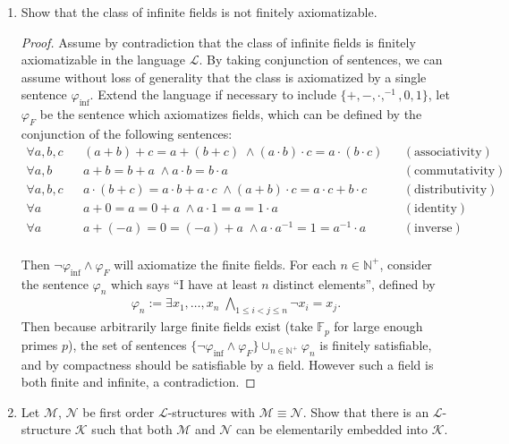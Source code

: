 \documentclass{article}
\begin{document}
\begin{enumerate}
  \item Show that the class of infinite fields is not finitely
    axiomatizable.
    \begin{proof}
      Assume by contradiction that the class of infinite fields is finitely
      axiomatizable in the language $\mathcal{L}$. By taking conjunction of
      sentences, we can assume without loss of generality that the class is
      axiomatized by a single sentence $\varphi_{\text{inf}}$. Extend the
      language if necessary to include $\{+,-,\cdot,^{-1},0,1\}$, let
      $\varphi_F$ be the sentence which axiomatizes fields, which can be
      defined by the conjunction of the following sentences:
      \begin{align*}
        \forall a,b,c && (a+b)+c=a+(b+c)\; \wedge (a\cdot b)\cdot
          c=a\cdot(b\cdot c)  && (\text{associativity}) \\
        \forall a,b   && a+b=b+a\; \wedge a\cdot b=b\cdot a  &&
          (\text{commutativity}) \\
        \forall a,b,c && a\cdot(b+c)=a\cdot b+a\cdot c\; \wedge (a+b)\cdot
          c=a\cdot c+b\cdot c  && (\text{distributivity}) \\
        \forall a     && a+0=a=0+a\; \wedge a\cdot1=a=1\cdot a  &&
          (\text{identity}) \\
        \forall a     && a+(-a)=0=(-a)+a\; \wedge a\cdot
          a^{-1}=1=a^{-1}\cdot a  && (\text{inverse}) \\
      \end{align*}

      Then $\neg\varphi_{\text{inf}}\wedge\varphi_F$ will axiomatize the
      finite fields. For each $n\in\mathbb{N}^+$, consider the sentence
      $\varphi_n$ which says ``I have at least $n$ distinct elements'',
      defined by
      \begin{align*}
        \varphi_n := \exists x_1,\ldots,x_n\; \bigwedge_{1\leq i<j\leq n}
        \neg x_i=x_j.
      \end{align*}
      Then because arbitrarily large finite fields exist (take
      $\mathbb{F}_p$ for large enough primes $p$), the set of sentences
      $\{\neg\varphi_{\text{inf}}\wedge\varphi_F\}\cup_{n\in\mathbb{N}^+}\varphi_n$
      is finitely satisfiable, and by compactness should be satisfiable by
      a field. However such a field is both finite and infinite, a
      contradiction.
    \end{proof}

  \item Let $\mathcal{M}$, $\mathcal{N}$ be first order
    $\mathcal{L}$-structures with $\mathcal{M}\equiv\mathcal{N}$. Show that
    there is an $\mathcal{L}$-structure $\mathcal{K}$ such that both
    $\mathcal{M}$ and $\mathcal{N}$ can be elementarily embedded into
    $\mathcal{K}$. 


\end{enumerate}
\end{document}
